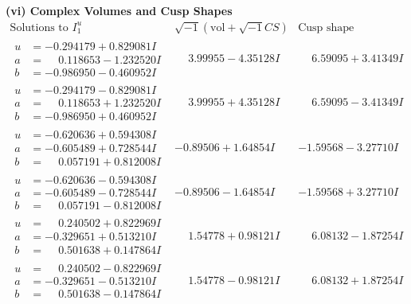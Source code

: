 \documentclass[1p]{elsarticle_modified}
\theoremstyle{definition}
\newcommand{\I}{\sqrt{-1}}
\begin{document}
\newpage\flushleft \textbf{(vi) Complex Volumes and Cusp Shapes}
$$\begin{array}{c|c|c}  
\text{Solutions to }I^u_{1}& \I (\text{vol} + \sqrt{-1}CS) & \text{Cusp shape}\\
 \hline 
\begin{aligned}
u &= -0.294179 + 0.829081 I \\
a &= \phantom{-}0.118653 - 1.232520 I \\
b &= -0.986950 - 0.460952 I\end{aligned}
 & \phantom{-}3.99955 - 4.35128 I & \phantom{-}6.59095 + 3.41349 I \\ \hline\begin{aligned}
u &= -0.294179 - 0.829081 I \\
a &= \phantom{-}0.118653 + 1.232520 I \\
b &= -0.986950 + 0.460952 I\end{aligned}
 & \phantom{-}3.99955 + 4.35128 I & \phantom{-}6.59095 - 3.41349 I \\ \hline\begin{aligned}
u &= -0.620636 + 0.594308 I \\
a &= -0.605489 + 0.728544 I \\
b &= \phantom{-}0.057191 + 0.812008 I\end{aligned}
 & -0.89506 + 1.64854 I & -1.59568 - 3.27710 I \\ \hline\begin{aligned}
u &= -0.620636 - 0.594308 I \\
a &= -0.605489 - 0.728544 I \\
b &= \phantom{-}0.057191 - 0.812008 I\end{aligned}
 & -0.89506 - 1.64854 I & -1.59568 + 3.27710 I \\ \hline\begin{aligned}
u &= \phantom{-}0.240502 + 0.822969 I \\
a &= -0.329651 + 0.513210 I \\
b &= \phantom{-}0.501638 + 0.147864 I\end{aligned}
 & \phantom{-}1.54778 + 0.98121 I & \phantom{-}6.08132 - 1.87254 I \\ \hline\begin{aligned}
u &= \phantom{-}0.240502 - 0.822969 I \\
a &= -0.329651 - 0.513210 I \\
b &= \phantom{-}0.501638 - 0.147864 I\end{aligned}
 & \phantom{-}1.54778 - 0.98121 I & \phantom{-}6.08132 + 1.87254 I \\ \hline\begin{aligned}

\end{aligned}
\end{array}$$
\end{document}

